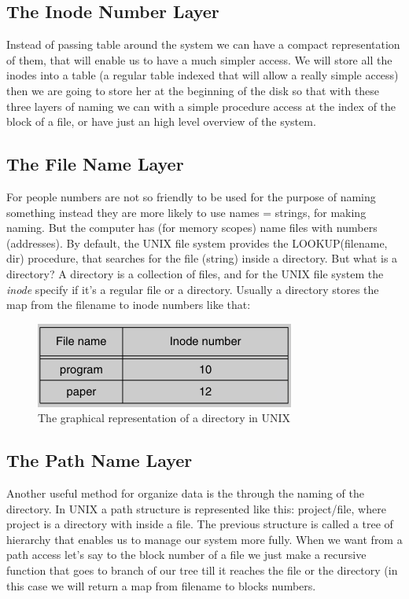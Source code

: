 \documentclass{article}
\begin{document}
    \subsection{The Inode Number Layer}
      Instead of passing table around the system we can have a compact representation
      of them, that will enable us to have a much simpler access. We will store all the 
      inodes into a table (a regular table indexed that will allow a really simple access)
      then we are going to store her at the beginning of the disk so that with these three
      layers of naming we can with a simple procedure access at the index of the block
      of a file, or have just an high level overview of the system.
    \subsection{The File Name Layer}
      For people numbers are not so friendly to be used for the purpose of naming something
      instead they are more likely to use names = strings, for making naming. But the computer
      has (for memory scopes) name files with numbers (addresses). By default, the UNIX file
      system provides the LOOKUP(filename, dir) procedure, that searches for the file (string)
      inside a directory. But what is a directory? A directory is a collection of files, and for
      the UNIX file system the \textit{inode} specify if it's a regular file or a directory.
      Usually a directory stores the map from the filename to inode numbers like that:
      \begin{figure}[h]
        \centering
        \includegraphics[width=.6\textwidth]{images/unix-directory.png}
        \caption{The graphical representation of a directory in UNIX}
        \label{fig:mesh3}
      \end{figure}
    \subsection{The Path Name Layer}
      Another useful method for organize data is the through the naming of the directory.
      In UNIX a path structure is represented like this: project/file, where project is 
      a directory with inside a file. The previous structure is called a tree of hierarchy 
      that enables us to manage our system more fully. When we want from a path access let's
      say to the block number of a file we just make a recursive function that goes to branch of our tree till it reaches the file or the directory (in this case we will
      return a map from filename to blocks numbers.
\end{document}
